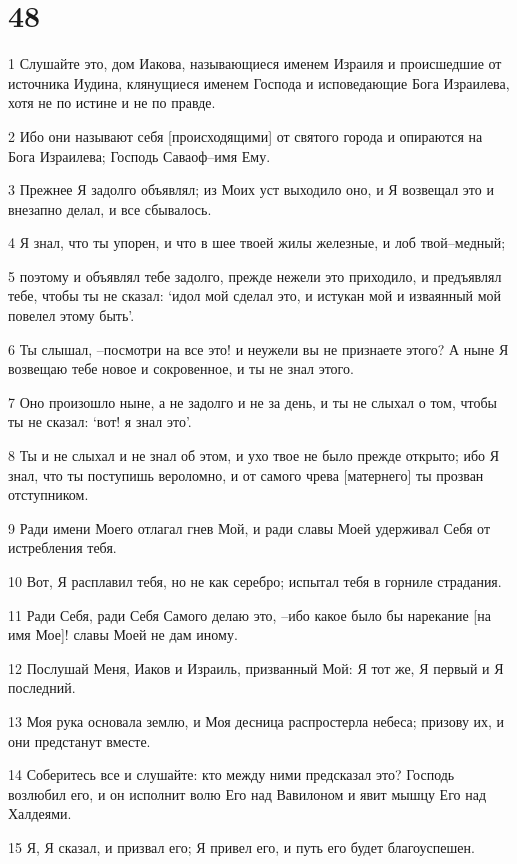 \chapter{48}

\par 1 Слушайте это, дом Иакова, называющиеся именем Израиля и происшедшие от источника Иудина, клянущиеся именем Господа и исповедающие Бога Израилева, хотя не по истине и не по правде.
\par 2 Ибо они называют себя [происходящими] от святого города и опираются на Бога Израилева; Господь Саваоф--имя Ему.
\par 3 Прежнее Я задолго объявлял; из Моих уст выходило оно, и Я возвещал это и внезапно делал, и все сбывалось.
\par 4 Я знал, что ты упорен, и что в шее твоей жилы железные, и лоб твой--медный;
\par 5 поэтому и объявлял тебе задолго, прежде нежели это приходило, и предъявлял тебе, чтобы ты не сказал: `идол мой сделал это, и истукан мой и изваянный мой повелел этому быть'.
\par 6 Ты слышал, --посмотри на все это! и неужели вы не признаете этого? А ныне Я возвещаю тебе новое и сокровенное, и ты не знал этого.
\par 7 Оно произошло ныне, а не задолго и не за день, и ты не слыхал о том, чтобы ты не сказал: `вот! я знал это'.
\par 8 Ты и не слыхал и не знал об этом, и ухо твое не было прежде открыто; ибо Я знал, что ты поступишь вероломно, и от самого чрева [матернего] ты прозван отступником.
\par 9 Ради имени Моего отлагал гнев Мой, и ради славы Моей удерживал Себя от истребления тебя.
\par 10 Вот, Я расплавил тебя, но не как серебро; испытал тебя в горниле страдания.
\par 11 Ради Себя, ради Себя Самого делаю это, --ибо какое было бы нарекание [на имя Мое]! славы Моей не дам иному.
\par 12 Послушай Меня, Иаков и Израиль, призванный Мой: Я тот же, Я первый и Я последний.
\par 13 Моя рука основала землю, и Моя десница распростерла небеса; призову их, и они предстанут вместе.
\par 14 Соберитесь все и слушайте: кто между ними предсказал это? Господь возлюбил его, и он исполнит волю Его над Вавилоном и явит мышцу Его над Халдеями.
\par 15 Я, Я сказал, и призвал его; Я привел его, и путь его будет благоуспешен.
